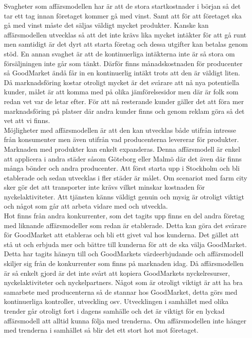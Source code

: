 \documentclass[10pt,a4paper,oneside]{article}
\begin{document}
Svagheter som affärsmodellen har är att de stora startkostnader i början så det tar ett tag innan företaget kommer gå med vinst. Samt att för att företaget ska gå med vinst måste det säljas väldigt mycket produkter. Kanske kan affärsmodellen utvecklas så att det inte krävs lika mycket intäkter för att gå runt men samtidigt är det dyrt att starta företag och dessa utgifter kan betalas genom stöd. En annan svaghet är att de kontinuerliga intäkterna inte är så stora om försäljningen inte går som tänkt. Därför finns månadskostnaden för producenter så GoodMarket ändå får in en kontinuerlig intäkt trots att den är väldigt liten. Då marknadsföring kostar otroligt mycket är det svårare att nå nya potentiella kunder, målet är att komma med på olika jämförelsesidor men där är folk som redan vet var de letar efter. För att nå resterande kunder gäller det att föra mer marknadsföring på platser där andra kunder finns och genom reklam göra så det vet att vi finns. \\ 

Möjligheter med affärsmodellen är att den kan utvecklas både utifrån intresse från konsumenter men även utifrån vad producenterna levererar för produkter. Marknaden med produkter kan enkelt expanderas. Denna affärsmodell är enkel att applicera i andra städer såsom Göteborg eller Malmö där det även där finns många bönder och andra producenter. Att först starta upp i Stockholm och bli etablerade och sedan utvecklas i fler städer är målet. Om scenariot med farm city sker gör det att transporter inte krävs vilket minskar kostnaden för nyckelaktiviteter. Att tjänsten känns väldigt genuin och mysig är otroligt viktigt och något som går att arbeta vidare med och utveckla. \\ 

Hot finns från andra konkurrenter, som det tagits upp finns en del andra företag med liknande affärsmodeller som redan är etablerade. Detta kan göra det svårare för GoodMarket att etableras och bli ett givet val hos kunderna. Det gället att stå ut och erbjuda mer och bättre till kunderna för att de ska välja GoodMarket. Detta har tagits hänsyn till och GoodMarkets värdeerbjudande och affärsmodell skiljer sig från de konkurrenter som finns på marknaden idag. Då affärsmodellen är så enkelt gjord är det inte svårt att kopiera GoodMarkets nyckelresurser, nyckelaktiviteter och nyckelpartners. Något som är otroligt viktigt är att ha bra samarbete med producenterna så de stannar hos GoodMarket, detta görs med kontinuerliga kontroller, utveckling osv. Utvecklingen i samhället med olika trender går otroligt fort i dagens samhälle och det är viktigt för en lyckad affärsmodell att alltid kunna följa med trenderna. Om affärsmodellen inte hänger med trenderna i samhället så blir det ett stort hot mot företaget. 
\end{document}
